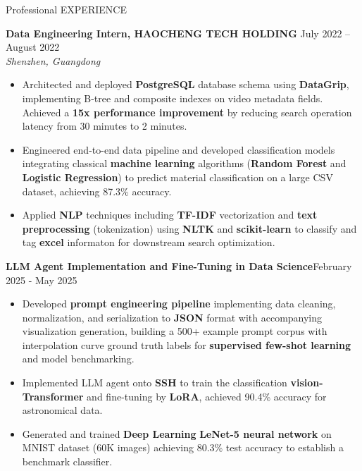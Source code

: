 \begin{rSection}{Professional EXPERIENCE}

    \setlength{\parskip}{1pt}
    \setlength{\baselineskip}{3pt}

\textbf{Data Engineering Intern, HAOCHENG TECH HOLDING} \hfill July 2022 -- August 2022 \\
\textit{Shenzhen, Guangdong}
\begin{itemize}
\vspace{-5pt}
    \item Architected and deployed \textbf{PostgreSQL} database schema using \textbf{DataGrip}, implementing B-tree and composite indexes on video metadata fields. Achieved a \textbf{15x performance improvement} by reducing search operation latency from 30 minutes to 2 minutes.
    
    \item Engineered end-to-end data pipeline and developed classification models integrating classical \textbf{machine learning} algorithms (\textbf{Random Forest} and \textbf{Logistic Regression}) to predict material classification on a large CSV dataset, achieving 87.3\% accuracy.

        \item Applied \textbf{NLP} techniques including \textbf{TF-IDF} vectorization and \textbf{text preprocessing} (tokenization) using \textbf{NLTK} and \textbf{scikit-learn} to classify and tag \textbf{excel} informaton for downstream search optimization.


\end{itemize}

\textbf{LLM Agent Implementation and Fine-Tuning in Data Science}\hfill February 2025 - May 2025
\begin{itemize}
\vspace{-5pt}
\item Developed \textbf{prompt engineering pipeline} implementing data cleaning, normalization, and serialization to \textbf{JSON} format with accompanying visualization generation, building a 500+ example prompt corpus with interpolation curve ground truth labels for \textbf{supervised few-shot learning} and model benchmarking.
    \item Implemented LLM agent onto \textbf{SSH}  to train the classification \textbf{vision-Transformer }and fine-tuning by \textbf{LoRA}, achieved
    90.4\% accuracy for astronomical data.

\item Generated and trained \textbf{Deep Learning }\textbf{LeNet-5 neural network} on MNIST dataset (60K images) achieving 80.3\% test accuracy to establish a benchmark classifier.
\end{itemize}


\end{rSection}
